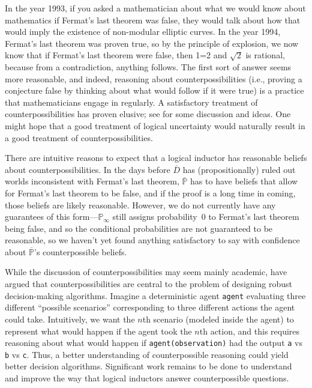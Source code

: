 \documentclass[authordate,onecolumn,noenvironments]{miri-tech-article}
\numberwithin{equation}{subsection}
\newcommand{\seq}[1]{{\overline{#1}}}
\newcommand{\BelState}{\mathbb{P}}
\newcommand{\pt}{\BelState}
\newcommand{\MP}{\seq{\pt}}
\newcommand{\dt}{D}
\newcommand{\DP}{\seq{\dt}}
\begin{document}
\noindent In the year 1993, if you asked a mathematician about what we would know about mathematics if Fermat's last theorem was false, they would talk about how that would imply the existence of non-modular elliptic curves. In the year 1994, Fermat's last theorem was proven true, so by the principle of explosion, we now know that if Fermat's last theorem were false, then 1=2 and $\sqrt{2}$ is rational, because from a contradiction, anything follows. The first sort of answer seems more reasonable, and indeed, reasoning about counterpossibilities (i.e., proving a conjecture false by thinking about what would follow if it were true) is a practice that mathematicians engage in regularly. A satisfactory treatment of counterpossibilities has proven elusive; see \citep{Cohen:1990,vander2004counterpossibles,brogaard2007counterpossibles,krakauer2012counterpossibles,bjerring2014counterpossibles} for some discussion and ideas. One might hope that a good treatment of logical uncertainty would naturally result in a good treatment of counterpossibilities.

There are intuitive reasons to expect that a logical inductor has reasonable beliefs about counterpossibilities. In the days before $\DP$ has (propositionally) ruled out worlds inconsistent with Fermat's last theorem, $\MP$ has to have beliefs that allow for Fermat's last theorem to be false, and if the proof is a long time in coming, those beliefs are likely reasonable. However, we do not currently have any guarantees of this form---$\pt_\infty$ still assigns probability~0 to Fermat's last theorem being false, and so the conditional probabilities are not guaranteed to be reasonable, so we haven't yet found anything satisfactory to say with confidence about $\MP$'s counterpossible beliefs.

While the discussion of counterpossibilities may seem mainly academic, \citet{Soares:2015:toward} have argued that counterpossibilities are central to the problem of designing robust decision-making algorithms. Imagine a deterministic agent \texttt{agent} evaluating three different ``possible scenarios'' corresponding to three different actions the agent could take. Intuitively, we want the $n$th scenario (modeled inside the agent) to represent what would happen if the agent took the $n$th action, and this requires reasoning about what would happen if \texttt{agent(observation)} had the output \texttt{a} vs \texttt{b} vs \texttt{c}. Thus, a better understanding of counterpossible reasoning could yield better decision algorithms. Significant work remains to be done to understand and improve the way that logical inductors answer counterpossible questions.
\end{document}
